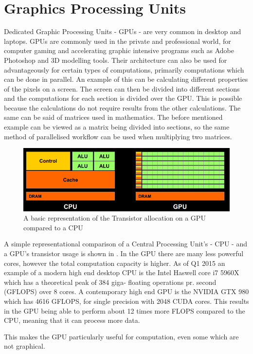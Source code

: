 \section{Graphics Processing Units}
\label{sec:GPU}
Dedicated Graphic Processing Units - GPUs - are very common in desktop and laptops. \citep{STEAMHW}
GPUs are commonly used in the private and professional world, for computer gaming and accelerating graphic intensive programs such as Adobe Photoshop and 3D modelling tools. \citep{NVIDIAADOBE}
Their architecture can also be used for advantageously for certain types of computations, primarily computations which can be done in parallel. 
An example of this can be calculating different properties of the pixels on a screen. 
The screen can then be divided into different sections and the computations for each section is divided over the GPU.
This is possible because the calculations do not require results from the other calculations.
The same can be said of matrices used in mathematics.
The before mentioned example can be viewed as a matrix being divided into sections, so the same method of parallelised workflow can be used when multiplying two matrices.

\begin{figure}[h!]
\centering
 \includegraphics[width=1\textwidth]{figures/GPUCPUimage.png} %
\caption{A basic representation of the Transistor allocation on a GPU compared to a CPU}\label{image:GPUCPUimage} %
\vspace{-15pt}
\end{figure}

A simple representational comparison of a Central Processing Unit's - CPU - and a GPU's transistor usage is shown in .
In the GPU there are many less powerful cores, however the total computation capacity is higher. 
As of Q1 2015 an example of a modern high end desktop CPU is the Intel Haswell core i7 5960X which has a theoretical peak of 384 giga- floating operations pr. second (GFLOPS) over 8 cores. \citep{puget}
A contemporary high end GPU is the NVIDIA GTX 980 which has 4616 GFLOPS, for single precision with 2048 CUDA cores. \citep{techpowerup,gtx980}
This results in the GPU being able to perform about 12 times more FLOPS compared to the CPU, meaning that it can process more data. 

This makes the GPU particularly useful for computation, even some which are not graphical. %